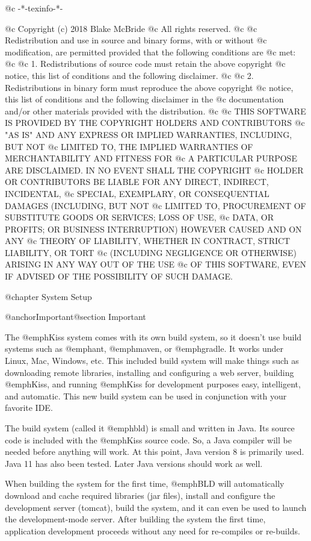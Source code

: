 @c -*-texinfo-*-

@c  Copyright (c) 2018 Blake McBride
@c  All rights reserved.
@c
@c  Redistribution and use in source and binary forms, with or without
@c  modification, are permitted provided that the following conditions are
@c  met:
@c
@c  1. Redistributions of source code must retain the above copyright
@c  notice, this list of conditions and the following disclaimer.
@c
@c  2. Redistributions in binary form must reproduce the above copyright
@c  notice, this list of conditions and the following disclaimer in the
@c  documentation and/or other materials provided with the distribution.
@c
@c  THIS SOFTWARE IS PROVIDED BY THE COPYRIGHT HOLDERS AND CONTRIBUTORS
@c  "AS IS" AND ANY EXPRESS OR IMPLIED WARRANTIES, INCLUDING, BUT NOT
@c  LIMITED TO, THE IMPLIED WARRANTIES OF MERCHANTABILITY AND FITNESS FOR
@c  A PARTICULAR PURPOSE ARE DISCLAIMED. IN NO EVENT SHALL THE COPYRIGHT
@c  HOLDER OR CONTRIBUTORS BE LIABLE FOR ANY DIRECT, INDIRECT, INCIDENTAL,
@c  SPECIAL, EXEMPLARY, OR CONSEQUENTIAL DAMAGES (INCLUDING, BUT NOT
@c  LIMITED TO, PROCUREMENT OF SUBSTITUTE GOODS OR SERVICES; LOSS OF USE,
@c  DATA, OR PROFITS; OR BUSINESS INTERRUPTION) HOWEVER CAUSED AND ON ANY
@c  THEORY OF LIABILITY, WHETHER IN CONTRACT, STRICT LIABILITY, OR TORT
@c  (INCLUDING NEGLIGENCE OR OTHERWISE) ARISING IN ANY WAY OUT OF THE USE
@c  OF THIS SOFTWARE, EVEN IF ADVISED OF THE POSSIBILITY OF SUCH DAMAGE.


@chapter System Setup

@anchor{Important}@section Important

The @emph{Kiss} system comes with its own build system, so it doesn't
use build systems such as @emph{ant}, @emph{maven}, or @emph{gradle}.
It works under Linux, Mac, Windows, etc. This included build system
will make things such as downloading remote libraries, installing and
configuring a web server, building @emph{Kiss}, and running
@emph{Kiss} for development purposes easy, intelligent, and automatic.
This new build system can be used in conjunction with your favorite IDE.

The build system (called it @emph{bld}) is small and written in Java.
Its source code is included with the @emph{Kiss} source code.  So, a
Java compiler will be needed before anything will work.  At this
point, Java version 8 is primarily used.  Java 11 has also been
tested.  Later Java versions should work as well.

When building the system for the first time, @emph{BLD} will
automatically download and cache required libraries (jar files), install and
configure the development server (tomcat), build the system, and it
can even be used to launch the development-mode server.  After building
the system the first time, application development proceeds without
any need for re-compiles or re-builds.

